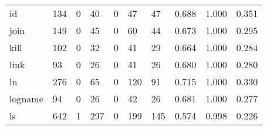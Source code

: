 \begin{longtable}{lp{1.3cm}p{1.3cm}p{1.3cm}p{1.3cm}p{1.3cm}p{1.3cm}p{1.3cm}p{1.3cm}p{1.3cm}}
id        &                    134 &                                  0 &                                40 &                                0 &                                47 &                              47 &                                0.688 &                                  1.000 &                                0.351 \\
join      &                    149 &                                  0 &                                45 &                                0 &                                60 &                              44 &                                0.673 &                                  1.000 &                                0.295 \\
kill      &                    102 &                                  0 &                                32 &                                0 &                                41 &                              29 &                                0.664 &                                  1.000 &                                0.284 \\
link      &                     93 &                                  0 &                                26 &                                0 &                                41 &                              26 &                                0.680 &                                  1.000 &                                0.280 \\
ln        &                    276 &                                  0 &                                65 &                                0 &                               120 &                              91 &                                0.715 &                                  1.000 &                                0.330 \\
logname   &                     94 &                                  0 &                                26 &                                0 &                                42 &                              26 &                                0.681 &                                  1.000 &                                0.277 \\
ls        &                    642 &                                  1 &                               297 &                                0 &                               199 &                             145 &                                0.574 &                                  0.998 &                                0.226 \\

\end{longtable}
